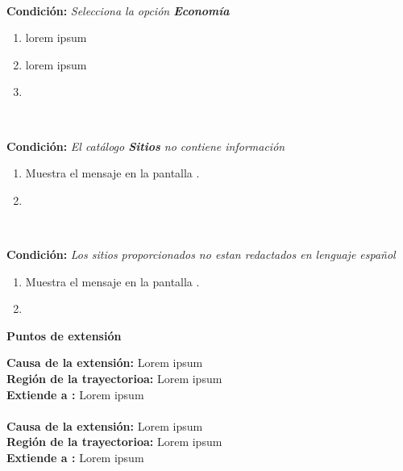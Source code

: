 \begin{large}
	\\
\end{large}	
\textbf{Condición:} \textit{Selecciona la opción \textbf{Economía}}

\begin{enumerate}[{C-}1.]

	\item \actor lorem ipsum
	\item \sistema lorem ipsum
	\item \finTA	

\end{enumerate}

\begin{large}
	\\
\end{large}	
\textbf{Condición:} \textit{El catálogo \textbf{Sitios} no contiene información}

\begin{enumerate}[{D-}1.]

	\item \sistema Muestra el mensaje  en la pantalla .
	\item \finCU	

\end{enumerate}

\begin{large}
	\\
\end{large}	
\textbf{Condición:} \textit{Los sitios proporcionados no estan redactados en lenguaje español}

\begin{enumerate}[{E-}1.]

	\item \sistema Muestra el mensaje   en la pantalla .
	\item \finCU	

\end{enumerate}


\begin{large}
	\textbf{Puntos de extensión}\\
\end{large}	

\textbf{Causa de la extensión:} Lorem ipsum\\
\textbf{Región de la trayectorioa:} Lorem ipsum\\
\textbf{Extiende a :} Lorem ipsum\\\\

\textbf{Causa de la extensión:} Lorem ipsum\\
\textbf{Región de la trayectorioa:} Lorem ipsum\\
\textbf{Extiende a :} Lorem ipsum\\

